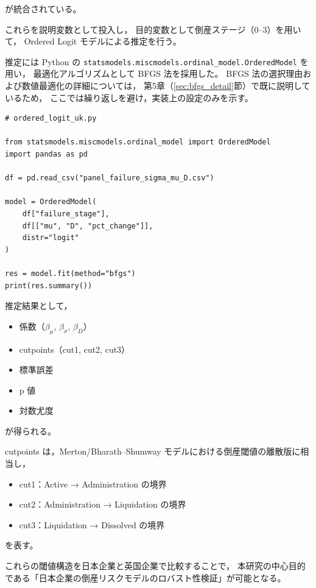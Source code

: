 が統合されている。

これらを説明変数として投入し，
目的変数として倒産ステージ（0--3）を用いて，
Ordered Logit モデルによる推定を行う。

推定には Python の \texttt{statsmodels.miscmodels.ordinal\_model.OrderedModel} を用い，
最適化アルゴリズムとして BFGS 法を採用した。
BFGS 法の選択理由および数値最適化の詳細については，
第5章（\ref{sec:bfgs_detail}節）で既に説明しているため，
ここでは繰り返しを避け，実装上の設定のみを示す。

\begin{verbatim}
# ordered_logit_uk.py

from statsmodels.miscmodels.ordinal_model import OrderedModel
import pandas as pd

df = pd.read_csv("panel_failure_sigma_mu_D.csv")

model = OrderedModel(
    df["failure_stage"],
    df[["mu", "D", "pct_change"]],
    distr="logit"
)

res = model.fit(method="bfgs")
print(res.summary())
\end{verbatim}


推定結果として，

\begin{itemize}
    \item 係数（$\beta_\mu$, $\beta_\sigma$, $\beta_D$）
    \item cutpoints（cut1, cut2, cut3）
    \item 標準誤差
    \item p 値
    \item 対数尤度
\end{itemize}

が得られる。

cutpoints は，Merton/Bharath–Shumway モデルにおける倒産閾値の離散版に相当し，

\begin{itemize}
    \item cut1：Active → Administration の境界
    \item cut2：Administration → Liquidation の境界
    \item cut3：Liquidation → Dissolved の境界
\end{itemize}

を表す。

これらの閾値構造を日本企業と英国企業で比較することで，
本研究の中心目的である「日本企業の倒産リスクモデルのロバスト性検証」が可能となる。


